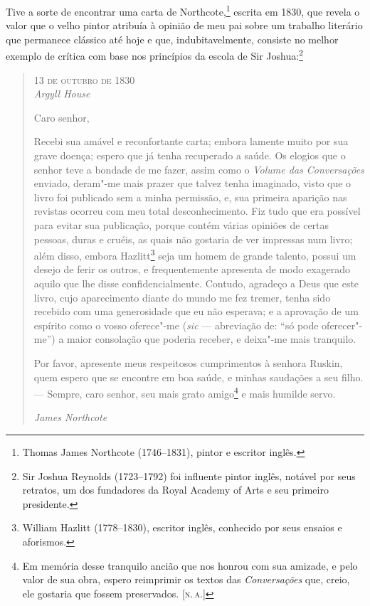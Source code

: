 Tive a sorte de encontrar uma carta de Northcote,\footnote{Thomas
  James Northcote (1746--1831), pintor e escritor inglês.}
escrita em 1830, que revela o valor que o velho pintor atribuía à
opinião de meu pai sobre um trabalho literário que permanece clássico
até hoje e que, indubitavelmente, consiste no melhor exemplo de crítica
com base nos princípios da escola de Sir Joshua:\footnote{Sir Joshua
  Reynolds (1723--1792) foi influente pintor inglês, notável por seus
  retratos, um dos fundadores da Royal Academy of Arts e seu primeiro
  presidente.} %

\begin{quote}
\begin{flushright}
\hfill\textsc{13 de outubro de 1830}\\
\textit{Argyll House}
\end{flushright}
\bigskip

Caro senhor,

Recebi sua amável e reconfortante carta; embora
lamente muito por sua grave doença; espero que já tenha recuperado a
saúde. Os elogios que o senhor teve a bondade de me fazer, assim como o
\textit{Volume das Conversações} enviado, deram"-me mais prazer que talvez
tenha imaginado, visto que o livro foi publicado sem a minha permissão,
e, sua primeira aparição nas revistas ocorreu com meu total
desconhecimento. Fiz tudo que era possível para evitar sua publicação,
porque contém várias opiniões de certas pessoas, duras e cruéis, as
quais não gostaria de ver impressas num livro; além disso, embora
Hazlitt\footnote{William Hazlitt (1778--1830), escritor inglês, conhecido
  por seus ensaios e aforismos.} seja um homem de grande
talento, possui um desejo de ferir os outros, e frequentemente apresenta
de modo exagerado aquilo que lhe disse confidencialmente. Contudo,
agradeço a Deus que este livro, cujo aparecimento diante do mundo me fez
tremer, tenha sido recebido com uma generosidade que eu não esperava; e
a aprovação de um espírito como o vosso oferece"-me (\textit{sic} ---
abreviação de: ``só pode oferecer"-me'') a maior consolação que poderia
receber, e deixa"-me mais tranquilo.

Por favor, apresente meus respeitosos cumprimentos à senhora Ruskin,
quem espero que se encontre em boa saúde, e minhas saudações a seu
filho. --- Sempre, caro senhor, seu mais grato amigo\footnote{Em memória
  desse tranquilo ancião que nos honrou com sua amizade, e pelo valor de
  sua obra, espero reimprimir os textos das \textit{Conversações} que,
  creio, ele gostaria que fossem preservados. {[}\textsc{n.\,a.}{]}} e mais
humilde servo.

\smallskip

\begin{flushright}
\hfill\textit{James Northcote}
\end{flushright}

\end{quote}

